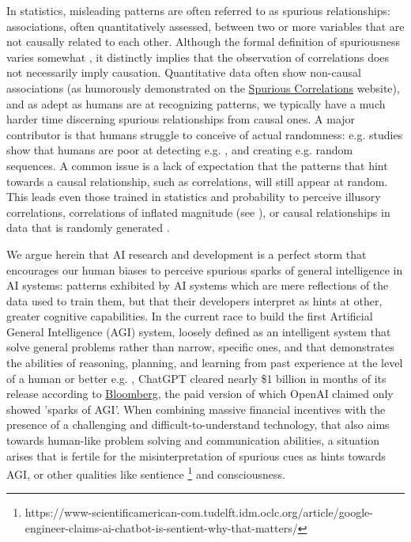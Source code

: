 \documentclass{article}
\theoremstyle{plain}
\theoremstyle{definition}
\theoremstyle{remark}
\begin{document}
In statistics, misleading patterns are often referred to as spurious relationships: associations, often quantitatively assessed, between two or more variables that are not causally related to each other. Although the formal definition of spuriousness varies somewhat \cite{haig2003spurious}, it distinctly implies that the observation of correlations does not necessarily imply causation. Quantitative data often show non-causal associations (as humorously demonstrated on the \href{http://www.tylervigen.com/spurious-correlations}{Spurious Correlations} website), and as adept as humans are at recognizing patterns, we typically have a much harder time discerning spurious relationships from causal ones. A major contributor is that humans struggle to conceive of actual randomness: e.g. studies show that humans are poor at detecting e.g. \cite{falk1997making}, and creating e.g. \cite{ladouceur1996erroneous} random sequences. A common issue is a lack of expectation that the patterns that hint towards a causal relationship, such as correlations, will still appear at random. This leads even those trained in statistics and probability to perceive illusory correlations, correlations of inflated magnitude (see \cite{nickerson1998confirmation}), or causal relationships in data that is randomly generated \cite{zgraggen2018investigating}.

We argue herein that AI research and development is a perfect storm that encourages our human biases to perceive spurious sparks of general intelligence in AI systems: patterns exhibited by AI systems which are mere reflections of the data used to train them, but that their developers interpret as hints at other, greater cognitive capabilities. In the current race to build the first Artificial General Intelligence (AGI) system, loosely defined as an intelligent system that solve general problems rather than narrow, specific ones, and that demonstrates the abilities of reasoning, planning, and learning from past experience at the level of a human or better e.g. \cite{bubeck2023sparks}, ChatGPT cleared nearly \$1 billion in months of its release according to \href{https://www.bloomberg.com/news/articles/2023-08-30/openai-nears-1-billion-of-annual-sales-as-chatgpt-takes-off}{Bloomberg}, the paid version of which OpenAI claimed only showed 'sparks of AGI'. When combining massive financial incentives with the presence of a challenging and difficult-to-understand technology, that also aims towards human-like problem solving and communication abilities, a situation arises that is fertile for the misinterpretation of spurious cues as hints towards AGI, or other qualities like sentience \footnote{https://www-scientificamerican-com.tudelft.idm.oclc.org/article/google-engineer-claims-ai-chatbot-is-sentient-why-that-matters/} and consciousness.
\end{document}
